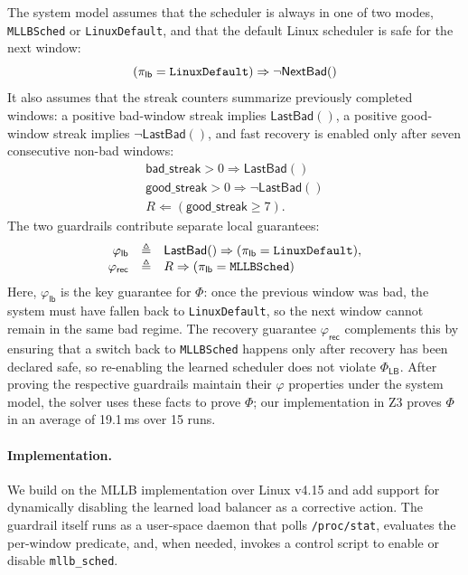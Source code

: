 The system model assumes that the scheduler is always in one of two modes, {\tt MLLBSched} or {\tt LinuxDefault}, and that the default Linux scheduler is safe for the next window:
\[
(\policy_{\mathsf{lb}} = {\tt LinuxDefault}) \Rightarrow \neg \mathsf{NextBad}()
\]
It also assumes that the streak counters summarize previously completed windows: a positive bad-window streak implies $\mathsf{LastBad}()$, a positive good-window streak implies $\neg \mathsf{LastBad}()$, and fast recovery is enabled only after seven consecutive non-bad windows:
\[
\begin{array}{c}
\mathsf{bad\_streak} > 0 \Rightarrow \mathsf{LastBad}()\\
\mathsf{good\_streak} > 0 \Rightarrow \neg \mathsf{LastBad}()\\
R \Leftarrow (\mathsf{good\_streak} \geq 7).
\end{array}\]
The two guardrails contribute separate local guarantees:
\[
\begin{array}{rcl}
\varphi_{\mathsf{lb}} &\triangleq & \mathsf{LastBad}() \Rightarrow (\policy_{\mathsf{lb}} = {\tt LinuxDefault}),
\\
\varphi_{\mathsf{rec}} &\triangleq & R \Rightarrow (\policy_{\mathsf{lb}} = {\tt MLLBSched})
\end{array}
\]
Here, $\varphi_{\mathsf{lb}}$ is the key guarantee for $\Phi$: once the previous window was bad, the system must have fallen back to {\tt LinuxDefault}, so the next window cannot remain in the same bad regime. The recovery guarantee $\varphi_{\mathsf{rec}}$ complements this by ensuring that a switch back to {\tt MLLBSched} happens only after recovery has been declared safe, so re-enabling the learned scheduler does not violate $\Phi_{\mathsf{LB}}$.
After proving the respective guardrails maintain their $\varphi$ properties under the system model, the solver uses these facts to prove $\Phi$; our implementation in Z3 proves $\Phi$ in an average of 19.1\,ms over 15 runs.

\paragraph{Implementation.}
We build on the MLLB implementation over Linux v4.15 and add support for dynamically disabling the learned load balancer as a corrective action. The guardrail itself runs as a user-space daemon that polls {\tt /proc/stat}, evaluates the per-window predicate, and, when needed, invokes a control script to enable or disable {\tt mllb\_sched}.

